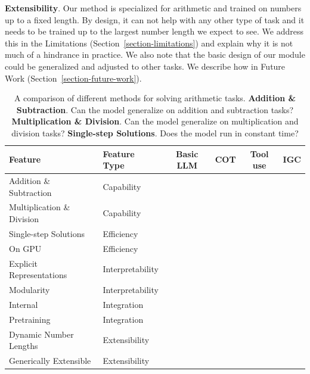 \documentclass[11pt]{article}
\newcommand{\cmark}{\textcolor{green}{\ding{51}}}
\newcommand{\xmark}{\textcolor{red}{\ding{55}}}
\newcommand{\pmark}{\textcolor{orange}{\Circle}}
\begin{document}
\textbf{Extensibility}.
Our method is specialized for arithmetic and trained on numbers up to a fixed length. By design, it can not help with any other type of task and it needs to be trained up to the largest number length we expect to see.
We address this in the Limitations (Section~\ref{section-limitations}) and explain why it is not much of a hindrance in practice.
We also note that the basic design of our module could be generalized and adjusted to other tasks. We describe how in Future Work (Section~\ref{section-future-work}).


\begin{table}
    \centering
    \begin{tabular}{|l|l|c|c|c|c|}
        \hline
        \textbf{Feature} & \textbf{Feature Type} & \textbf{Basic LLM} & \textbf{COT} & \textbf{Tool use} & \textbf{IGC} \\
        \hline
        Addition \& Subtraction & Capability & \xmark & \cmark & \cmark & \cmark \\
        Multiplication \& Division & Capability & \xmark & \xmark & \cmark & \cmark \\
        \hline
        Single-step Solutions & Efficiency & \cmark & \xmark & \xmark & \cmark \\
        On GPU & Efficiency & \cmark & \cmark & \xmark & \cmark \\
        \hline
        Explicit Representations & Interpretability & \xmark & \cmark & \cmark & \cmark \\
        Modularity & Interpretability & \xmark & \pmark & \pmark & \cmark \\
        \hline
        Internal & Integration & \cmark & \xmark & \xmark & \cmark \\
        Pretraining & Integration & \cmark & \xmark & \xmark & \cmark \\
        \hline
        Dynamic Number Lengths & Extensibility & \cmark & \cmark & \cmark & \xmark \\
        Generically Extensible & Extensibility & \cmark & \cmark & \cmark & \pmark \\
        \hline
    \end{tabular}
    \caption{
    A comparison of different methods for solving arithmetic tasks.
    \textbf{Addition \& Subtraction}. Can the model generalize on addition and subtraction tasks?
    \textbf{Multiplication \& Division}. Can the model generalize on multiplication and division tasks?
    \textbf{Single-step Solutions}. Does the model run in constant time?
}
\end{table}
\end{document}

